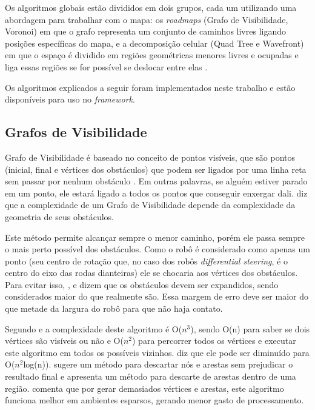 Os algoritmos globais estão divididos em dois grupos, cada um utilizando uma abordagem para trabalhar com o mapa: os \textit{roadmaps} (Grafo de Visibilidade, Voronoi) em que o grafo representa um conjunto de caminhos livres ligando posições específicas do mapa, e a decomposição celular (Quad Tree e Wavefront) em que o espaço é dividido em regiões geométricas menores livres e ocupadas e liga essas regiões se for possível se deslocar entre elas \cite{Souza2008}.

Os algoritmos explicados a seguir foram implementados neste trabalho e estão disponíveis para uso no \textit{framework}.

\subsection{Grafos de Visibilidade}

Grafo de Visibilidade é baseado no conceito de pontos visíveis, que são pontos (inicial, final e vértices dos obstáculos) que podem ser ligados por uma linha reta sem passar por nenhum obstáculo \cite{Guzman2008}. Em outras palavras, se alguém estiver parado em um ponto, ele estará ligado a todos os pontos que conseguir enxergar dali. \cite{Souza2008} diz que a complexidade de um Grafo de Visibilidade depende da complexidade da geometria de seus obstáculos.

Este método permite alcançar sempre o menor caminho, porém ele passa sempre o mais perto possível dos obstáculos. Como o robô é considerado como apenas um ponto (seu centro de rotação que, no caso dos robôs \textit{differential steering}, é o centro do eixo das rodas dianteiras) ele se chocaria aos vértices dos obstáculos. Para evitar isso, \cite{Souza2008}, \cite{Siegwart2004} e \cite{Thomsen2010} dizem que os obstáculos devem ser expandidos, sendo considerados maior do que realmente são. Essa margem de erro deve ser maior do que metade da largura do robô para que não haja contato.

Segundo \cite{Thomsen2010} e \cite{Choset2005} a complexidade deste algoritmo é O($n^3$), sendo O(n) para saber se dois vértices são visíveis ou não e O($n^2$) para percorrer todos os vértices e executar este algoritmo em todos os possíveis vizinhos. \cite{Thomsen2010} diz que ele pode ser diminuído para O($n^2$log(n)). \cite{Medeiros2011} sugere um método para descartar nós e arestas sem prejudicar o resultado final e \cite{Choset2005} apresenta um método para descarte de arestas dentro de uma região. \cite{Siegwart2004} comenta que por gerar demasiados vértices e arestas, este algoritmo funciona melhor em ambientes esparsos, gerando menor gasto de processamento.

